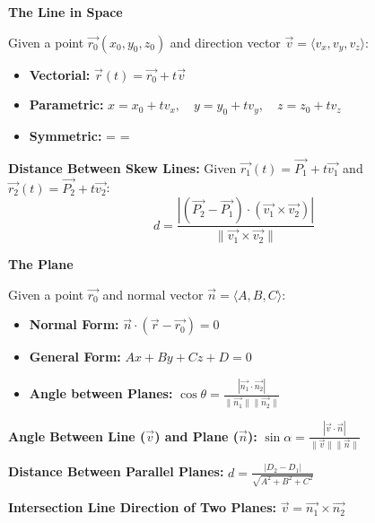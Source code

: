 \documentclass[10pt, landscape, twocolumn]{article}
\newcommand{\cheatsheetsubsection}[1]{
    \vspace{0.4em}
    {\color{themeblue}\normalsize\bfseries #1} \par
    \vspace{0.1em}
}
\begin{document}
\cheatsheetsubsection{The Line in Space}
Given a point $\vec{r_0}(x_0, y_0, z_0)$ and direction vector $\vec{v} = \langle v_x, v_y, v_z \rangle$:
\begin{itemize}[leftmargin=*, nosep]
    \item \textbf{Vectorial:} $\vec{r}(t) = \vec{r_0} + t\vec{v}$
    \item \textbf{Parametric:} $x = x_0 + tv_x, \quad y = y_0 + tv_y, \quad z = z_0 + tv_z$
    \item \textbf{Symmetric:}  =  = 
\end{itemize}

\textbf{Distance Between Skew Lines:} Given $\vec{r_1}(t) = \vec{P_1} + t\vec{v_1}$ and $\vec{r_2}(t) = \vec{P_2} + t\vec{v_2}$:
\[ d = \frac{|(\vec{P_2} - \vec{P_1}) \cdot (\vec{v_1} \times \vec{v_2})|}{\|\vec{v_1} \times \vec{v_2}\|} \]

\cheatsheetsubsection{The Plane}
Given a point $\vec{r_0}$ and normal vector $\vec{n} = \langle A, B, C \rangle$:
\begin{itemize}[leftmargin=*, nosep]
    \item \textbf{Normal Form:} $\vec{n} \cdot (\vec{r} - \vec{r_0}) = 0$
    \item \textbf{General Form:} $Ax + By + Cz + D = 0$
    \item \textbf{Angle between Planes:} $\cos \theta = \frac{|\vec{n_1} \cdot \vec{n_2}|}{\|\vec{n_1}\| \|\vec{n_2}\|}$
\end{itemize}

\textbf{Angle Between Line ($\vec{v}$) and Plane ($\vec{n}$):} $\sin \alpha = \frac{|\vec{v} \cdot \vec{n}|}{\|\vec{v}\| \|\vec{n}\|}$

\textbf{Distance Between Parallel Planes:} $d = \frac{|D_2 - D_1|}{\sqrt{A^2 + B^2 + C^2}}$

\textbf{Intersection Line Direction of Two Planes:} $\vec{v} = \vec{n_1} \times \vec{n_2}$

\vspace{-0.5em}
\begin{center}
\end{center}
\vspace{-0.5em}
\end{document}
